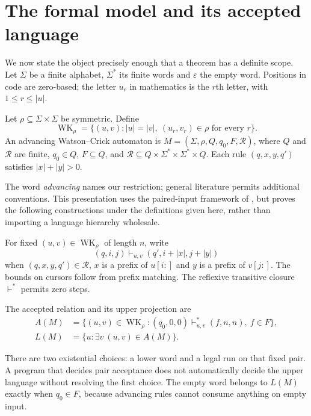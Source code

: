 \section{The formal model and its accepted language}
We now state the object precisely enough that a theorem has a definite scope.
Let $\Sigma$ be a finite alphabet, $\Sigma^*$ its finite words and
$\varepsilon$ the empty word. Positions in code are zero-based; the letter
$u_r$ in mathematics is the $r$th letter, with $1\leq r\leq |u|$.

\begin{definition}
Let $\rho\subseteq\Sigma\times\Sigma$ be symmetric. Define
\[
 \operatorname{WK}_{\rho}=
 \{(u,v):|u|=|v|,\ (u_r,v_r)\in\rho\text{ for every }r\}.
\]
An advancing Watson--Crick automaton is
$M=(\Sigma,\rho,Q,q_0,F,\mathcal R)$, where $Q$ and $\mathcal R$ are finite,
$q_0\in Q$, $F\subseteq Q$, and
$\mathcal R\subseteq Q\times\Sigma^*\times\Sigma^*\times Q$.
Each rule $(q,x,y,q')$ satisfies $|x|+|y|>0$.
\end{definition}
The word \emph{advancing} names our restriction; general literature permits
additional conventions. This presentation uses the paired-input framework of
\cite{Czeizler2009}, but proves the following constructions under the definitions
given here, rather than importing a language hierarchy wholesale.

For fixed $(u,v)\in\operatorname{WK}_\rho$ of length $n$, write
\begin{equation}
 (q,i,j)\vdash_{u,v}(q',i+|x|,j+|y|)
 \label{eq:stepformal}
\end{equation}
when $(q,x,y,q')\in\mathcal R$, $x$ is a prefix of $u[i:]$ and $y$ is a
prefix of $v[j:]$. The bounds on cursors follow from prefix matching.
The reflexive transitive closure $\vdash^*$ permits zero steps.
\begin{definition}
The accepted relation and its upper projection are
\begin{align}
 A(M)&=\{(u,v)\in\operatorname{WK}_\rho:
       (q_0,0,0)\vdash_{u,v}^*(f,n,n),\ f\in F\},\\
 L(M)&=\{u:\exists v\ (u,v)\in A(M)\}.
\end{align}
\end{definition}
There are two existential choices: a lower word and a legal run on that
fixed pair. A program that decides pair acceptance does not automatically
decide the upper language without resolving the first choice. The empty
word belongs to $L(M)$ exactly when $q_0\in F$, because advancing rules
cannot consume anything on empty input.

